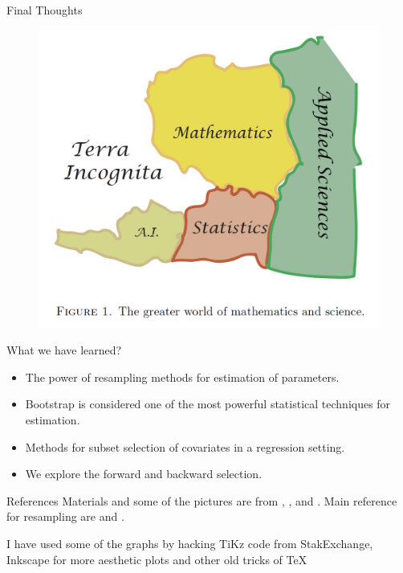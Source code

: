 \documentclass{beamer}
\begin{document}
\begin{frame}{Final Thoughts}
	
	
	\begin{figure}[h]
		\centering
		\includegraphics[scale=0.5]{../../Figures/fig_efron_paper.png}
	\end{figure}
\end{frame}
		
\begin{frame}{What we have learned?	}
	\begin{itemize}
		\item The power of resampling methods for estimation of parameters.
		\item Bootstrap is considered one of the most powerful statistical techniques for estimation. 
		\item Methods for subset selection of covariates in a regression setting.
		\item We explore the forward and backward selection.
	\end{itemize}
\end{frame}

\begin{frame}{References}
	Materials and some of the pictures are from \citep{James2015}, \citep{hastie01}, and \citep{geron2}. Main reference for resampling are \citep{efronbook} and \citep{efron2012}.
	\printbibliography 	
	
	I have used some of the graphs by hacking TiKz code from StakExchange, Inkscape for more aesthetic plots and other old tricks of \TeX
	
\end{frame}



	
\end{document}
